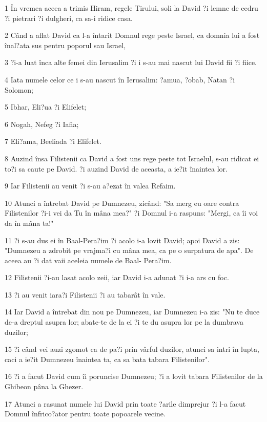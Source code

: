 \par 1 În vremea aceea a trimis Hiram, regele Tirului, soli la David ?i lemne de cedru ?i pietrari ?i dulgheri, ca sa-i ridice casa.
\par 2 Când a aflat David ca l-a întarit Domnul rege peste Israel, ca domnia lui a fost înal?ata sus pentru poporul sau Israel,
\par 3 ?i-a luat înca alte femei din Ierusalim ?i i s-au mai nascut lui David fii ?i fiice.
\par 4 Iata numele celor ce i s-au nascut în Ierusalim: ?amua, ?obab, Natan ?i Solomon;
\par 5 Ibhar, Eli?ua ?i Elifelet;
\par 6 Nogah, Nefeg ?i Iafia;
\par 7 Eli?ama, Beeliada ?i Elifelet.
\par 8 Auzind însa Filistenii ca David a fost uns rege peste tot Israelul, s-au ridicat ei to?i sa caute pe David. ?i auzind David de aceasta, a ie?it înaintea lor.
\par 9 Iar Filistenii au venit ?i s-au a?ezat în valea Refaim.
\par 10 Atunci a întrebat David pe Dumnezeu, zicând: "Sa merg eu oare contra Filistenilor ?i-i vei da Tu în mâna mea?" ?i Domnul i-a raspuns: "Mergi, ca îi voi da în mâna ta!"
\par 11 ?i s-au dus ei în Baal-Pera?im ?i acolo i-a lovit David; apoi David a zis: "Dumnezeu a zdrobit pe vrajma?i cu mâna mea, ca pe o surpatura de apa". De aceea au ?i dat vaii aceleia numele de Baal- Pera?im.
\par 12 Filistenii ?i-au lasat acolo zeii, iar David i-a adunat ?i i-a ars cu foc.
\par 13 ?i au venit iara?i Filistenii ?i au tabarât în vale.
\par 14 Iar David a întrebat din nou pe Dumnezeu, iar Dumnezeu i-a zis: "Nu te duce de-a dreptul asupra lor; abate-te de la ei ?i te du asupra lor pe la dumbrava duzilor;
\par 15 ?i când vei auzi zgomot ca de pa?i prin vârful duzilor, atunci sa intri în lupta, caci a ie?it Dumnezeu înaintea ta, ca sa bata tabara Filistenilor".
\par 16 ?i a facut David cum îi poruncise Dumnezeu; ?i a lovit tabara Filistenilor de la Ghibeon pâna la Ghezer.
\par 17 Atunci a rasunat numele lui David prin toate ?arile dimprejur ?i l-a facut Domnul înfrico?ator pentru toate popoarele vecine.

